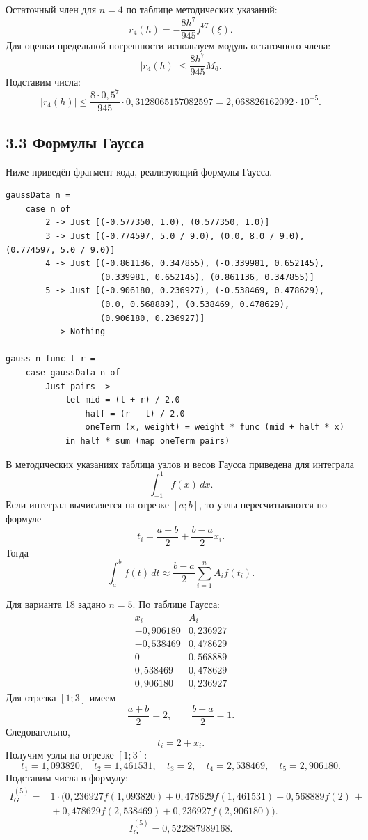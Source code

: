 \documentclass[14pt,a4paper]{extarticle}
\begin{document}
Остаточный член для $n=4$ по таблице методических указаний:
\[
    r_4(h)=-\frac{8h^7}{945}f^{VI}(\xi).
\]
Для оценки предельной погрешности используем модуль остаточного члена:
\[
    |r_4(h)|\leq \frac{8h^7}{945}M_6.
\]
Подставим числа:
\[
    |r_4(h)|\leq
    \frac{8\cdot0{,}5^7}{945}\cdot0{,}3128065157082597
    =2{,}068826162092\cdot10^{-5}.
\]

\subsection*{3.3 Формулы Гаусса}
Ниже приведён фрагмент кода, реализующий формулы Гаусса.

\begin{lstlisting}[caption={Фрагмент кода формул Гаусса}]
gaussData n =
    case n of
        2 -> Just [(-0.577350, 1.0), (0.577350, 1.0)]
        3 -> Just [(-0.774597, 5.0 / 9.0), (0.0, 8.0 / 9.0), (0.774597, 5.0 / 9.0)]
        4 -> Just [(-0.861136, 0.347855), (-0.339981, 0.652145),
                   (0.339981, 0.652145), (0.861136, 0.347855)]
        5 -> Just [(-0.906180, 0.236927), (-0.538469, 0.478629),
                   (0.0, 0.568889), (0.538469, 0.478629),
                   (0.906180, 0.236927)]
        _ -> Nothing

gauss n func l r =
    case gaussData n of
        Just pairs ->
            let mid = (l + r) / 2.0
                half = (r - l) / 2.0
                oneTerm (x, weight) = weight * func (mid + half * x)
            in half * sum (map oneTerm pairs)
\end{lstlisting}

В методических указаниях таблица узлов и весов Гаусса приведена для интеграла
\[
    \int_{-1}^{1}f(x)\,dx.
\]
Если интеграл вычисляется на отрезке $[a;b]$, то узлы пересчитываются по формуле
\[
    t_i=\frac{a+b}{2}+\frac{b-a}{2}x_i.
\]
Тогда
\[
    \int_a^b f(t)\,dt \approx \frac{b-a}{2}\sum_{i=1}^{n}A_if(t_i).
\]

Для варианта 18 задано $n=5$. По таблице Гаусса:
\[
\begin{array}{c|c}
    x_i & A_i \\ \hline
    -0{,}906180 & 0{,}236927 \\
    -0{,}538469 & 0{,}478629 \\
    0 & 0{,}568889 \\
    0{,}538469 & 0{,}478629 \\
    0{,}906180 & 0{,}236927
\end{array}
\]
Для отрезка $[1;3]$ имеем
\[
    \frac{a+b}{2}=2,\qquad \frac{b-a}{2}=1.
\]
Следовательно,
\[
    t_i=2+x_i.
\]
Получим узлы на отрезке $[1;3]$:
\[
    t_1=1{,}093820,\quad
    t_2=1{,}461531,\quad
    t_3=2,
    \quad t_4=2{,}538469,
    \quad t_5=2{,}906180.
\]
Подставим числа в формулу:
\begingroup\small
\[
\begin{aligned}
I_G^{(5)}={}&1\cdot\bigl(
0{,}236927f(1{,}093820)+0{,}478629f(1{,}461531)+0{,}568889f(2)\,+{}\\
&{}+0{,}478629f(2{,}538469)+0{,}236927f(2{,}906180)
\bigr).
\end{aligned}
\]
\endgroup
\[
    I_G^{(5)}=0{,}522887989168.
\]
\end{document}
